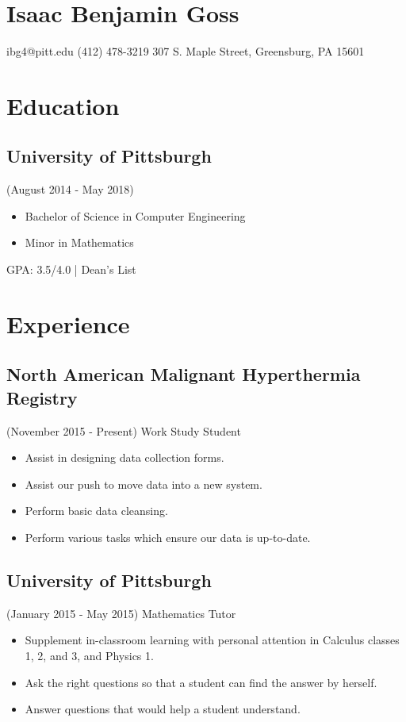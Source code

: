 \documentclass{article}
\begin{document}
  \section{Isaac Benjamin Goss}
    ibg4@pitt.edu
    (412) 478-3219
    307 S. Maple Street, Greensburg, PA 15601
    
  \section{Education}
    \subsection{University of Pittsburgh}
      (August 2014 - May 2018)
      \begin{itemize}
        \item Bachelor of Science in Computer Engineering
        \item Minor in Mathematics
      \end{itemize}
      GPA: 3.5/4.0 | Dean's List
  
  \section{Experience}
    \subsection{North American Malignant Hyperthermia Registry}
      (November 2015 - Present)
      Work Study Student
      \begin{itemize}
        \item Assist in designing data collection forms.
        \item Assist our push to move data into a new system.
        \item Perform basic data cleansing.
        \item Perform various tasks which ensure our data is up-to-date.
      \end{itemize}
    \subsection{University of Pittsburgh}
      (January 2015 - May 2015)
      Mathematics Tutor
      \begin{itemize}
        \item Supplement in-classroom learning with personal attention in Calculus classes 1, 2, and 3, and Physics 1.
        \item Ask the right questions so that a student can find the answer by herself.
        \item Answer questions that would help a student understand.
      \end{itemize}
\end{document}
